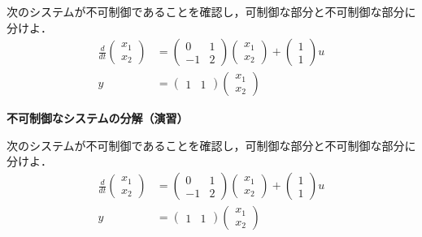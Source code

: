 \documentclass[a4paper,11pt]{jreport}
\begin{document}
次のシステムが不可制御であることを確認し，可制御な部分と不可制御な部分に分けよ．\begin{align*}
	\frac{d}{dt}
	\left (
	\begin{array}{c}
	 x_1 \\ x_2 
	\end{array}
	\right )
	& = 
	\left (
	\begin{array}{cc}
	 0 & 1 \\
	 -1 & 2
	\end{array}
	\right )
	\left (
	\begin{array}{c}
	 x_1 \\ x_2 
	\end{array}
	\right )
	+
	\left (
	\begin{array}{c}
	 1 \\ 1 
	\end{array}
	\right )
	u
\\
	y 
	&=
	\left (
	\begin{array}{cc}
	 1 & 1  
	\end{array}
	\right )
	\left (
	\begin{array}{c}
	 x_1 \\ x_2 
	\end{array}
	\right )
\end{align*}

\newpage

\noindent
{\bf 不可制御なシステムの分解（演習）}

次のシステムが不可制御であることを確認し，可制御な部分と不可制御な部分に分けよ．\begin{align*}
	\frac{d}{dt}
	\left (
	\begin{array}{c}
	 x_1 \\ x_2 
	\end{array}
	\right )
	& = 
	\left (
	\begin{array}{cc}
	 0 & 1 \\
	 -1 & 2
	\end{array}
	\right )
	\left (
	\begin{array}{c}
	 x_1 \\ x_2 
	\end{array}
	\right )
	+
	\left (
	\begin{array}{c}
	 1 \\ 1 
	\end{array}
	\right )
	u
\\
	y 
	&=
	\left (
	\begin{array}{cc}
	 1 & 1  
	\end{array}
	\right )
	\left (
	\begin{array}{c}
	 x_1 \\ x_2 
	\end{array}
	\right )
\end{align*}
\end{document}
